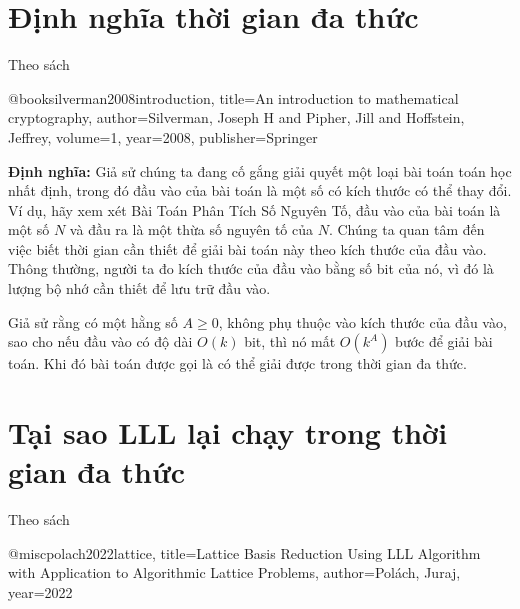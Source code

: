 \documentclass{article}
\begin{document}



\section{Định nghĩa thời gian đa thức}





Theo sách

@book{silverman2008introduction,
    title={An introduction to mathematical cryptography},
    author={Silverman, Joseph H and Pipher, Jill and Hoffstein, Jeffrey},
    volume={1},
    year={2008},
    publisher={Springer}
}





\textbf{Định nghĩa:} Giả sử chúng ta đang cố gắng giải quyết một loại bài toán toán học nhất định, trong đó đầu vào của bài toán là một số có kích thước có thể thay đổi. Ví dụ, hãy xem xét Bài Toán Phân Tích Số Nguyên Tố, đầu vào của bài toán là một số \( N \) và đầu ra là một thừa số nguyên tố của \( N \). Chúng ta quan tâm đến việc biết thời gian cần thiết để giải bài toán này theo kích thước của đầu vào. Thông thường, người ta đo kích thước của đầu vào bằng số bit của nó, vì đó là lượng bộ nhớ cần thiết để lưu trữ đầu vào.

Giả sử rằng có một hằng số \( A \geq 0 \), không phụ thuộc vào kích thước của đầu vào, sao cho nếu đầu vào có độ dài \( O(k) \) bit, thì nó mất \( O(k^A) \) bước để giải bài toán. Khi đó bài toán được gọi là có thể giải được trong thời gian đa thức.





\section{Tại sao LLL lại chạy trong thời gian đa thức}

Theo sách


@misc{polach2022lattice,
  title={Lattice Basis Reduction Using LLL Algorithm with Application to Algorithmic Lattice Problems},
  author={Pol{\'a}ch, Juraj},
  year={2022}
}
\end{document}
